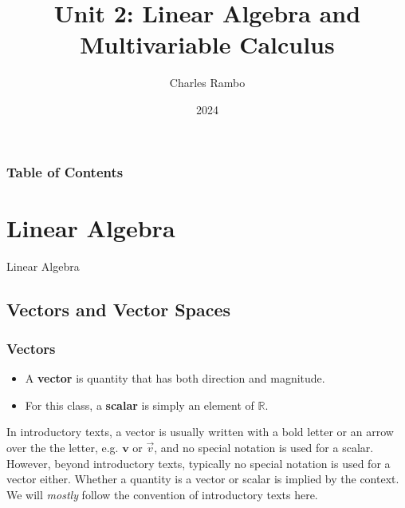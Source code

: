 \documentclass{beamer}
\title{Unit 2: Linear Algebra and Multivariable Calculus}
\author{Charles Rambo}
\institute{UCLA Anderson}
\date{2024}
\begin{document}



\frame{\titlepage}

\begin{frame}[allowframebreaks]

\frametitle{Table of Contents}
\tableofcontents
\end{frame}


\section{Linear Algebra}

\begin{frame}
\begin{center}
\Huge Linear Algebra
\end{center}
\end{frame}

\subsection{Vectors and Vector Spaces}

\begin{frame}
\frametitle{Vectors}
\begin{definition}
\begin{itemize}
\item A {\bf vector} is quantity that has both direction and magnitude.
\item For this class, a {\bf scalar} is simply an element of $\mathbb{R}$.
\end{itemize}
\end{definition}

In introductory texts, a vector is usually written with a bold letter or an arrow over the the letter, e.g. ${\boldsymbol v}$ or $\vec{v}$, and no special notation is used for a scalar. However, beyond introductory texts, typically no special notation is used for a vector either. Whether a quantity is a vector or scalar is implied by the context. We will {\it mostly} follow the convention of introductory texts here.

\end{frame}
\end{document}
